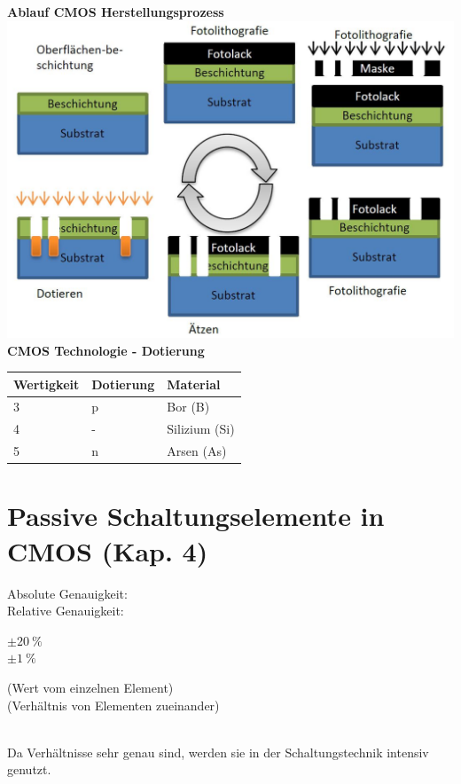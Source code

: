 \begin{minipage}[t]{0.5\textwidth}
	\textbf{Ablauf CMOS Herstellungsprozess}\\
	\includegraphics[width=1\textwidth, right]{chapters/Technologie/images/Verarbeitung}
	\textbf{CMOS Technologie - Dotierung}\\ 
	\begin{tabular}{|l|l|l|}
		\hline
		\textbf{Wertigkeit}&\textbf{Dotierung}&\textbf{Material}\\ \hline
		3&p&Bor (B)\\ \hline
		4&-&Silizium (Si)\\ \hline
		5&n&Arsen (As)\\ \hline
	\end{tabular}
\end{minipage}

\section{Passive Schaltungselemente in CMOS (Kap. 4)}

\begin{minipage}[c]{0.22\textwidth}
	Absolute Genauigkeit:\\Relative Genauigkeit:
\end{minipage}
\begin{minipage}[c]{0.06\textwidth}
	$\pm \SI{20}{\percent}$\\ $\pm \SI{1}{\percent}$
\end{minipage}
\begin{minipage}[c]{0.5\textwidth}
	(Wert vom einzelnen Element)\\(Verhältnis von Elementen zueinander)
\end{minipage}\\[1ex]
Da Verhältnisse sehr genau sind, werden sie in der Schaltungstechnik intensiv genutzt.


